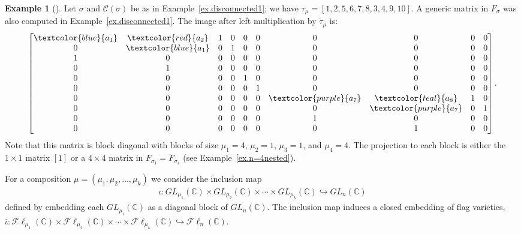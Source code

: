 \documentclass[11pt]{amsart}
\theoremstyle{remark}
\theoremstyle{remark}
\theoremstyle{definition}
\theoremstyle{definition}
\theoremstyle{definition}
\newtheorem{eg_no_qed}[theorem]{Example}
\newenvironment{ex}[1][]{\begin{eg_no_qed}[#1]\renewcommand{\qedsymbol}{$\Diamond$}\pushQED{\qed}}{\popQED\end{eg_no_qed}}
\numberwithin{equation}{section}
\newcommand{\C}{\mathbb{C}}           %
\newcommand{\gs}{\sigma}
\newcommand{\cc}{\mathcal{C}}
\newcommand{\cupsigma}{\cc(\gs)}
\newcommand{\cell}{F_\gs}
\newcommand{\Fl}{\mathcal{F}\ell}
\begin{document}
\begin{ex} \label{ex.disconnected2} Let $\gs$ and $\cupsigma$ be as in Example~\ref{ex.disconnected1}; we have $\tau_\mu = [1,2,5,6,7,8,3,4,9,10]$.  A generic matrix in $\cell$ was also computed in Example~\ref{ex.disconnected1}. The image after left multiplication by $\dot\tau_\mu$ is:
\[
\begin{bmatrix} 
\textcolor{blue}{a_1} & \textcolor{red}{a_2} & 1 & 0 & 0 & 0 & 0 & 0 & 0 & 0 \\ 
0 & \textcolor{blue}{a_1} & 0 & 1 & 0 & 0 & 0 & 0 & 0 & 0\\
1 & 0 & 0 & 0 & 0 & 0 & 0 & 0 & 0 & 0\\
0 & 1 & 0 & 0 & 0 & 0 & 0 & 0 & 0 & 0\\
0 & 0 & 0 & 0 & 1 & 0 & 0 & 0 & 0 & 0\\
0 & 0 & 0 & 0 & 0 & 1 & 0 & 0 & 0 & 0\\
0 & 0 & 0 & 0 & 0 & 0 & \textcolor{purple}{a_7} & \textcolor{teal}{a_8} & 1 & 0\\
0 & 0 & 0 & 0 & 0 & 0 & 0 & \textcolor{purple}{a_7} & 0 & 1\\
0 & 0 & 0 & 0 & 0 & 0 & 1 & 0 & 0 & 0\\
0 & 0 & 0 & 0 & 0 & 0 & 0 & 1 & 0 & 0\\
\end{bmatrix}. 
\]
Note that this matrix is block diagonal with blocks of size $\mu_1=4,\, \mu_2=1,\, \mu_3=1$, and $\mu_4=4$. The projection to each block is either the $1\times 1$ matrix $[1]$ or a $4\times 4$ matrix in $F_{\sigma_1} = F_{\sigma_4}$ (see Example~\ref{ex.n=4nested}).
\end{ex}





For a composition $\mu= (\mu_1, \mu_2, \ldots, \mu_k)$ we consider the inclusion map
\begin{align}\label{eqn.inclusion}
\iota: GL_{\mu_1}(\C) \times GL_{\mu_2}(\C) \times \cdots \times GL_{\mu_k}(\C) \hookrightarrow GL_n(\C)
\end{align}
defined by embedding each $GL_{\mu_i}(\C)$ as a diagonal block of $GL_n(\C)$. The inclusion map induces a closed embedding of flag varieties, $\bar\iota:\Fl_{\mu_1}(\C) \times \Fl_{\mu_2}(\C)\times \cdots \times \Fl_{\mu_k}(\C) \hookrightarrow \Fl_n(\C)$.  
\end{document}

